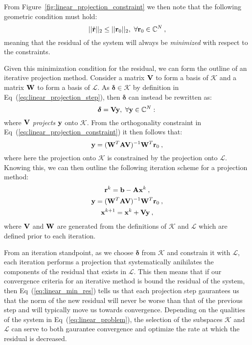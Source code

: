 From Figure~\ref{fig:linear_projection_constraint} we then note that
the following geometric condition must hold:
\begin{equation}
  ||\tilde{\ve{r}}||_2 \leq ||\ve{r}_0||_2,\ \forall \ve{r}_0 \in
  \mathbb{C}^N\:,
  \label{eq:linear_min_res}
\end{equation}
meaning that the residual of the system will always be
\textit{minimized} with respect to the constraints.

Given this minimization condition for the residual, we can form the
outline of an iterative projection method. Consider a matrix $\mathbf{V}$
to form a basis of $\mathcal{K}$ and a matrix $\mathbf{W}$ to form a basis
of $\mathcal{L}$. As $\boldsymbol{\delta} \in \mathcal{K}$ by
definition in Eq~(\ref{eq:linear_projection_step}), then
$\boldsymbol{\delta}$ can instead be rewritten as:
\begin{equation}
  \boldsymbol{\delta} = \mathbf{V}\mathbf{y},\ \forall \mathbf{y} \in \mathbb{C}^N:\,
  \label{eq:linear_delta_projection}
\end{equation}
where $\mathbf{V}$ \textit{projects} $\mathbf{y}$ onto $\mathcal{K}$. From the
orthogonality constraint in Eq~(\ref{eq:linear_projection_constraint})
it then follows that:
\begin{equation}
  \mathbf{y} = (\mathbf{W}^T\mathbf{A}\mathbf{V})^{-1}\mathbf{W}^T\mathbf{r}_0\:,
  \label{eq:linear_constraint_projection}
\end{equation}
where here the projection onto $\mathcal{K}$ is constrained by the
projection onto $\mathcal{L}$. Knowing this, we can then outline the
following iteration scheme for a projection method:
\begin{subequations}
  \begin{gather}
    \mathbf{r}^k = \mathbf{b} - \mathbf{A}\mathbf{x}^k\:,\\  
    \mathbf{y} = (\mathbf{W}^T\mathbf{A}\mathbf{V})^{-1}\mathbf{W}^T\mathbf{r}_0\:,\\
    \mathbf{x}^{k+1} = \mathbf{x}^k + \mathbf{V}\mathbf{y}\:,
  \end{gather}
  \label{eq:linear_projection_iteration}
\end{subequations}
where $\mathbf{V}$ and $\mathbf{W}$ are generated from the definitions of
$\mathcal{K}$ and $\mathcal{L}$ which are defined prior to each
iteration.

From an iteration standpoint, as we choose $\boldsymbol{\delta}$ from
$\mathcal{K}$ and constrain it with $\mathcal{L}$, each iteration
performs a projection that systematically anihilates the components of
the residual that exists in $\mathcal{L}$. This then means that if our
convergence criteria for an iterative method is bound the residual of
the system, then Eq~(\ref{eq:linear_min_res}) tells us that each
projection step gaurantees us that the norm of the new residual will
never be worse than that of the previous step and will typically move
us towards convergence. Depending on the qualities of the system in
Eq~(\ref{eq:linear_problem}), the selection of the subspaces
$\mathcal{K}$ and $\mathcal{L}$ can serve to both gaurantee
convergence and optimize the rate at which the residual is decreased.

